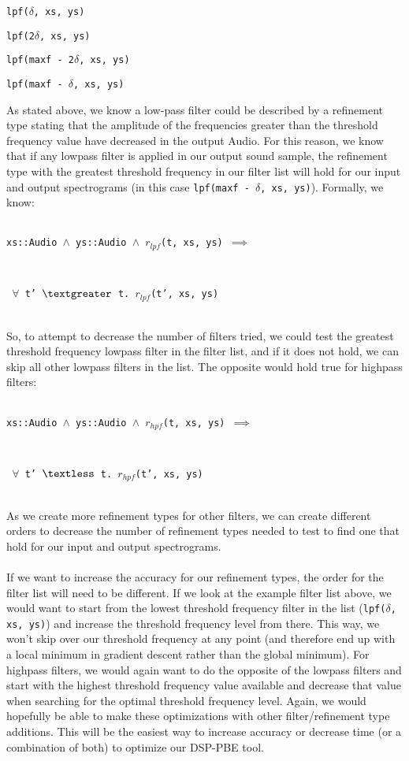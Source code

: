 \begin{enumerate}
{ \item{\texttt{lpf($\delta$, xs, ys)}}}
{ \item{\texttt{lpf(2$\delta$, xs, ys)}}}
\end{enumerate}
\centerline{\bm{$\vdots$}} 
\begin{enumerate}
{ \item{\texttt{lpf(maxf - 2$\delta$, xs, ys)}}}
{ \item{\texttt{lpf(maxf - $\delta$, xs, ys)}}}
\end{enumerate}
As stated above, we know a low-pass filter could be described by a refinement type stating that the amplitude of the frequencies greater than the threshold frequency value have decreased in the output Audio. For this reason, we know that if any lowpass filter is applied in our output sound sample, the refinement type with the greatest threshold frequency in our filter list will hold for our input and output spectrograms (in this case \texttt{lpf(maxf - $\delta$, xs, ys)}). Formally, we know: \\ \\
\centerline{\texttt{xs::Audio $\land$ ys::Audio $\land$ $r_{lpf}$(t, xs, ys) $\implies$}} \\
\centerline{\texttt{ $\forall$ t' $\textgreater$ t. $r_{lpf}$(t', xs, ys)}} ~\\
So, to attempt to decrease the number of filters tried, we could test the greatest threshold frequency lowpass filter in the filter list, and if it does not hold, we can skip all other lowpass filters in the list. The opposite would hold true for highpass filters: \\ \\
\centerline{\texttt{xs::Audio $\land$ ys::Audio $\land$ $r_{hpf}$(t, xs, ys) $\implies$}}\\
\centerline{\texttt{ $\forall$ t' $\textless$ t. $r_{hpf}$(t', xs, ys)}} ~\\
As we create more refinement types for other filters, we can create different orders to decrease the number of refinement types needed to test to find one that hold for our input and output spectrograms. \\ \\
If we want to increase the accuracy for our refinement types, the order for the filter list will need to be different. If we look at the example filter list above, we would want to start from the lowest threshold frequency filter in the list (\texttt{lpf($\delta$, xs, ys)}) and increase the threshold frequency level from there. This way, we won't skip over our threshold frequency at any point (and therefore end up with a local minimum in gradient descent rather than the global minimum). For highpass filters, we would again want to do the opposite of the lowpass filters and start with the highest threshold frequency value available and decrease that value when searching for the optimal threshold frequency level. Again, we would hopefully be able to make these optimizations with other filter/refinement type additions. This will be the easiest way to increase accuracy or decrease time (or a combination of both) to optimize our DSP-PBE tool.

